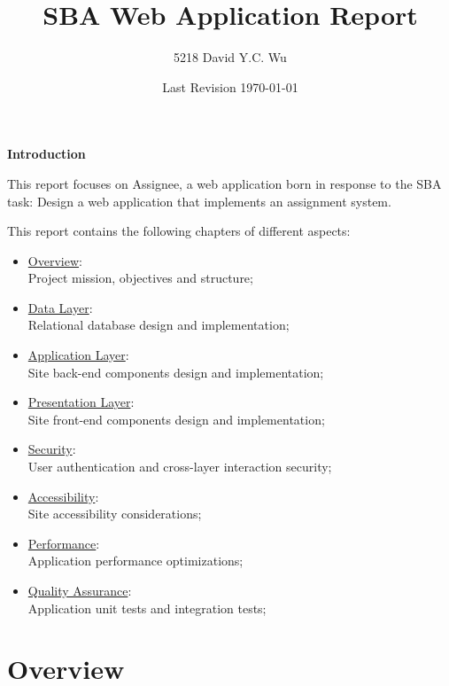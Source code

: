 \documentclass[12pt]{report}
\title{SBA Web Application Report}
\author{5218 David Y.C. Wu}
\date{Last Revision \today}
\begin{document}
\maketitle

\textbf{Introduction}
\vspace{1 em}

This report focuses on Assignee, a web application born in response to the SBA task: Design a web application that implements an assignment system.
\vspace{1 em}

This report contains the following chapters of different aspects:
\begin{itemize}
    \item \hyperref[ch:overview]{Overview}:\\
        Project mission, objectives and structure;
    \item \hyperref[ch:data-layer]{Data Layer}:\\
        Relational database design and implementation;
    \item \hyperref[ch:application-layer]{Application Layer}:\\
        Site back-end components design and implementation;
    \item \hyperref[ch:presentation-layer]{Presentation Layer}:\\
        Site front-end components design and implementation;
    \item \hyperref[ch:security]{Security}:\\
        User authentication and cross-layer interaction security;
    \item \hyperref[ch:accessibility]{Accessibility}:\\
        Site accessibility considerations;
    \item \hyperref[ch:performance]{Performance}:\\
        Application performance optimizations;
    \item \hyperref[ch:quality-assurance]{Quality Assurance}:\\
        Application unit tests and integration tests;
\end{itemize}

\tableofcontents
\newpage

\chapter{Overview} \label{ch:overview}
\end{document}
